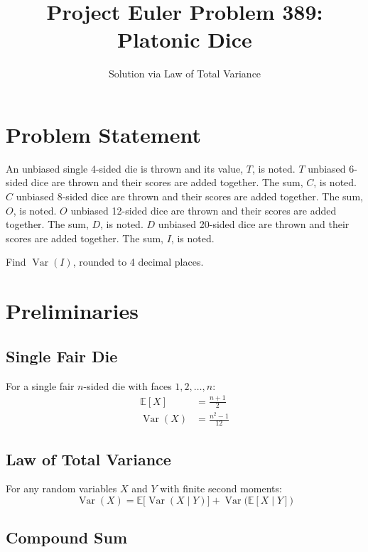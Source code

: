 \documentclass[11pt,a4paper]{article}
\title{Project Euler Problem 389:\\Platonic Dice}
\author{Solution via Law of Total Variance}
\date{}
\begin{document}
\maketitle

\section{Problem Statement}

An unbiased single 4-sided die is thrown and its value, $T$, is noted.
$T$ unbiased 6-sided dice are thrown and their scores are added together. The sum, $C$, is noted.
$C$ unbiased 8-sided dice are thrown and their scores are added together. The sum, $O$, is noted.
$O$ unbiased 12-sided dice are thrown and their scores are added together. The sum, $D$, is noted.
$D$ unbiased 20-sided dice are thrown and their scores are added together. The sum, $I$, is noted.

Find $\operatorname{Var}(I)$, rounded to 4 decimal places.

\section{Preliminaries}

\subsection{Single Fair Die}

For a single fair $n$-sided die with faces $1, 2, \ldots, n$:
\begin{align}
    \mathbb{E}[X] &= \frac{n+1}{2} \label{eq:die_mean} \\[6pt]
    \operatorname{Var}(X) &= \frac{n^2 - 1}{12} \label{eq:die_var}
\end{align}

\subsection{Law of Total Variance}

For any random variables $X$ and $Y$ with finite second moments:
\begin{equation}
    \operatorname{Var}(X) = \mathbb{E}\bigl[\operatorname{Var}(X \mid Y)\bigr]
        + \operatorname{Var}\bigl(\mathbb{E}[X \mid Y]\bigr)
    \label{eq:lotv}
\end{equation}

\subsection{Compound Sum}
\end{document}
